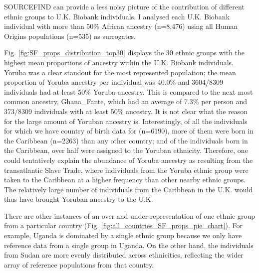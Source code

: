 SOURCEFIND can provide a less noisy picture of the contribution of different ethnic groups to U.K. Biobank individuals. I analysed each U.K. Biobank individual with more than 50\% African ancestry (n=8,476) using all Human Origins populations (n=535) as surrogates. 

Fig. \ref{fig:SF_props_distribution_top30} displays the 30 ethnic groups with the highest mean proportions of ancestry within the U.K. Biobank individuals. Yoruba was a clear standout for the most represented population; the mean proportion of Yoruba ancestry per individual was 40.0\% and 3604/8309 individuals had at least 50\% Yoruba ancestry. This is compared to the next most common ancestry, Ghana\_Fante, which had an average of 7.3\% per person and 373/8309 individuals with at least 50\% ancestry. It is not clear what the reason for the large amount of Yoruban ancestry is. Interestingly, of all the individuals for which we have country of birth data for (n=6190), more of them were born in the Caribbean (n=2263) than any other country; and of the individuals born in the Caribbean, over half were assigned to the Yoruban ethnicity. Therefore, one could tentatively explain the abundance of Yoruba ancestry as resulting from the transatlantic Slave Trade, where individuals from the Yoruba ethnic group were taken to the Caribbean at a higher frequency than other nearby ethnic groups. The relatively large number of individuals from the Caribbean in the U.K. would thus have brought Yoruban ancestry to the U.K. 

There are other instances of an over and under-representation of one ethnic group from a particular country (Fig. \ref{fig:all_countries_SF_props_pie_chart}). For example, Uganda is dominated by a single ethnic group because we only have reference data from a single group in Uganda. On the other hand, the individuals from Sudan are more evenly distributed across ethnicities, reflecting the wider array of reference populations from that country. 

